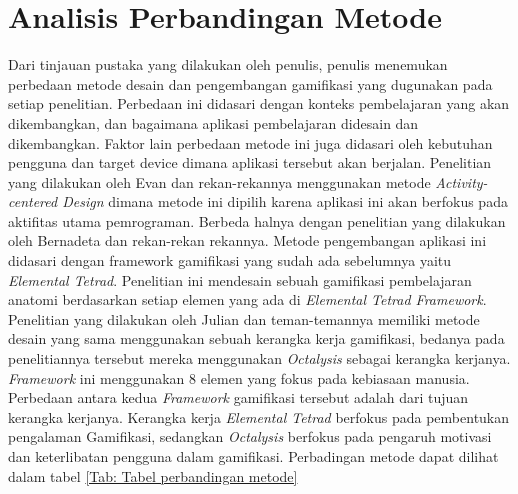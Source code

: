 \section{Analisis Perbandingan Metode}
Dari tinjauan pustaka yang dilakukan oleh penulis, penulis menemukan perbedaan metode desain dan pengembangan gamifikasi yang dugunakan pada setiap penelitian.
Perbedaan ini didasari dengan konteks pembelajaran yang akan dikembangkan, dan bagaimana aplikasi pembelajaran didesain dan dikembangkan.
Faktor lain perbedaan metode ini juga didasari oleh kebutuhan pengguna dan target device dimana aplikasi tersebut akan berjalan.
Penelitian yang dilakukan oleh Evan dan rekan-rekannya menggunakan metode \textit{Activity-centered Design} dimana metode ini dipilih karena aplikasi ini akan berfokus pada aktifitas utama pemrograman.
Berbeda halnya dengan penelitian yang dilakukan oleh Bernadeta dan rekan-rekan rekannya. Metode pengembangan aplikasi ini didasari dengan framework gamifikasi yang sudah ada sebelumnya yaitu \textit{Elemental Tetrad}.
Penelitian ini mendesain sebuah gamifikasi pembelajaran anatomi berdasarkan setiap elemen yang ada di \textit{Elemental Tetrad Framework}.
Penelitian yang dilakukan oleh Julian dan teman-temannya memiliki metode desain yang sama menggunakan sebuah kerangka kerja gamifikasi, 
bedanya  pada penelitiannya tersebut mereka menggunakan \textit{Octalysis} sebagai kerangka kerjanya. \textit{Framework} ini menggunakan 8 elemen yang fokus pada kebiasaan manusia.
Perbedaan antara kedua \textit{Framework} gamifikasi tersebut adalah dari tujuan kerangka kerjanya. Kerangka kerja \textit{Elemental Tetrad} berfokus pada pembentukan pengalaman Gamifikasi,
sedangkan \textit{Octalysis} berfokus pada pengaruh motivasi dan keterlibatan pengguna dalam gamifikasi. Perbadingan metode dapat dilihat dalam tabel \ref*{Tab: Tabel perbandingan metode}
\newpage

